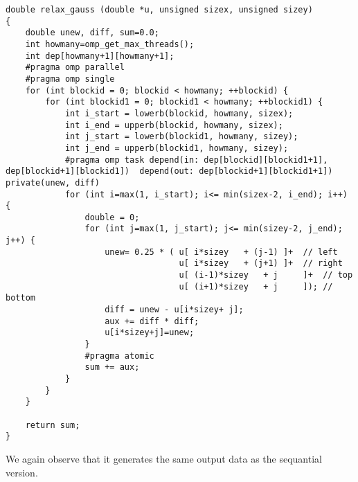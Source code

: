 \documentclass[11pt]{article}
\begin{document}
\begin{verbatim}
double relax_gauss (double *u, unsigned sizex, unsigned sizey)
{
    double unew, diff, sum=0.0;
    int howmany=omp_get_max_threads();
    int dep[howmany+1][howmany+1];
    #pragma omp parallel
    #pragma omp single
    for (int blockid = 0; blockid < howmany; ++blockid) {
        for (int blockid1 = 0; blockid1 < howmany; ++blockid1) {
            int i_start = lowerb(blockid, howmany, sizex);
            int i_end = upperb(blockid, howmany, sizex);
            int j_start = lowerb(blockid1, howmany, sizey);
            int j_end = upperb(blockid1, howmany, sizey);
            #pragma omp task depend(in: dep[blockid][blockid1+1], dep[blockid+1][blockid1])  depend(out: dep[blockid+1][blockid1+1])  private(unew, diff)
            for (int i=max(1, i_start); i<= min(sizex-2, i_end); i++) {
                double = 0;
                for (int j=max(1, j_start); j<= min(sizey-2, j_end); j++) {
                    unew= 0.25 * ( u[ i*sizey	+ (j-1) ]+  // left
                                   u[ i*sizey	+ (j+1) ]+  // right
                                   u[ (i-1)*sizey	+ j     ]+  // top
                                   u[ (i+1)*sizey	+ j     ]); // bottom
                    diff = unew - u[i*sizey+ j];
                    aux += diff * diff;
                    u[i*sizey+j]=unew;
                }
                #pragma atomic
                sum += aux;
            }
        }
    }

    return sum;
}

\end{verbatim}

We again observe that it generates the same output data as the sequantial version.
\end{document}
